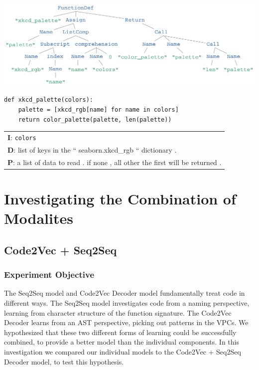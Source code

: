 \begin{listing}[h!] 
\begin{center}

\includegraphics[width=\linewidth]{ImagesCodeRelated/xkcd_palette_strip.png}
\begin{verbatim}
def xkcd_palette(colors):
    palette = [xkcd_rgb[name] for name in colors]
    return color_palette(palette, len(palette))

\end{verbatim}
\begin{tabular}{l}
\textbf{I}: \texttt{colors}\\
\textbf{D}: list of keys in the `` seaborn.xkcd\_rgb `` dictionary .\\
\textbf{P}: a list of data to read . if none , all other the first will be returned .\\
\end{tabular}
\end{center}
\end{listing}


\section{Investigating the Combination of Modalites} %
\label{sec:investigating_combined_channels}


\subsection{Code2Vec + Seq2Seq } %
\label{sub:combined_code2vec}


\subsubsection{Experiment Objective} %

The Seq2Seq model and Code2Vec Decoder model fundamentally treat code in different ways.
The Seq2Seq model investigates code from a naming perspective, learning from character structure of the function signature.
The Code2Vec Decoder learns from an AST perspective, picking out patterns in the VPCs. 
We hypothesized that these two different forms of learning could be successfully combined, to provide a better model than the individual components.
In this investigation we compared our individual models to the Code2Vec + Seq2Seq Decoder model, to test this hypothesis.

